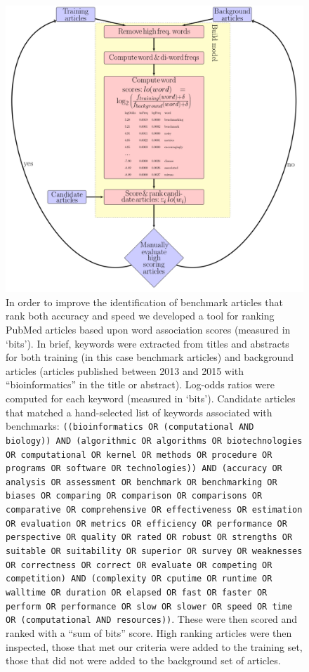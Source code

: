 \documentclass[fleqn,10pt]{SelfArx} %
\begin{document}
\begin{figure}[H]
\centering
\includegraphics[height=0.7\textheight]{litMiningFlowDiagram-edited.pdf}
\caption{In order to improve the identification of benchmark articles
  that rank both accuracy and speed we developed a tool for ranking
  PubMed articles based upon word association scores (measured in
  ‘bits’). In brief, keywords were extracted from titles and abstracts
  for both training (in this case benchmark articles) and background
  articles (articles published between 2013 and 2015 with
  “bioinformatics” in the title or abstract). Log-odds ratios were
  computed for each keyword (measured in ‘bits’). Candidate articles
  that matched a hand-selected list of keywords associated with
  benchmarks: \texttt{((bioinformatics OR (computational AND biology)) AND (algorithmic OR algorithms OR biotechnologies OR computational OR kernel OR methods OR procedure OR programs OR software OR technologies)) AND (accuracy OR analysis OR assessment OR benchmark OR benchmarking OR biases OR comparing OR comparison OR comparisons OR comparative OR comprehensive OR effectiveness OR estimation OR evaluation OR metrics OR efficiency OR performance OR perspective OR quality OR rated OR robust OR strengths OR suitable OR suitability OR superior OR survey OR weaknesses OR correctness OR correct OR evaluate OR competing OR competition) AND (complexity OR cputime OR runtime OR walltime OR duration OR elapsed OR fast OR faster OR perform OR performance OR slow OR slower OR speed OR time OR (computational AND resources))}. These 
  were then scored and ranked with a “sum of bits”
  score. High ranking articles were then inspected, those that met our
  criteria were added to the training set, those that did not were
  added to the background set of articles.}
\label{fig:flow}
\end{figure}
\end{document}
